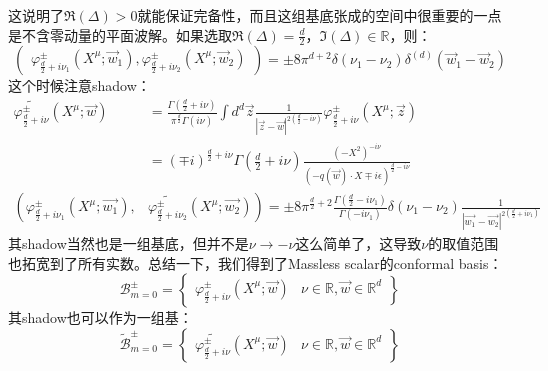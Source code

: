 这说明了$\Re(\Delta)>0$就能保证完备性，而且这组基底张成的空间中很重要的一点是不含零动量的平面波解。如果选取$\Re(\Delta)=\frac{d}{2}$，$\Im(\Delta)\in\mathbb{R}$，则：
\begin{equation}
	\begin{pmatrix}\varphi_{\frac{d}{2}+i\nu_{1}}^{\pm}(X^{\mu};\vec{w}_{1}),\varphi_{\frac{d}{2}+i\nu_{2}}^{\pm}(X^{\mu};\vec{w}_{2})\end{pmatrix}=\pm8\pi^{d+2}\delta(\nu_{1}-\nu_{2})\delta^{(d)}(\vec{w}_{1}-\vec{w}_{2})
\end{equation}
这个时候注意shadow：
\begin{equation}
	\begin{aligned}
		\widetilde{\varphi_{\frac{d}{2}+i\nu}^{\pm}}(X^{\mu};\vec{w})& =\frac{\Gamma(\frac{d}{2}+i\nu)}{\pi^{\frac{d}{2}}\Gamma(i\nu)}\int d^{d}\vec{z}\frac{1}{|\vec{z}-\vec{w}|^{2(\frac{d}{2}-i\nu)}}\varphi_{\frac{d}{2}+i\nu}^{\pm}(X^{\mu};\vec{z})  \\
		&=(\mp i)^{\frac d2+i\nu}\Gamma(\frac d2+i\nu)\frac{(-X^2)^{-i\nu}}{(-q(\vec{w})\cdot X\mp i\epsilon)^{\frac d2-i\nu}}\\
		\left(\varphi_{\frac{d}{2}+i\nu_1}^{\pm}(X^{\mu};\vec{w_1}),\right.&\left.\widetilde{\varphi_{\frac{d}{2}+i\nu_2}^{\pm}}(X^{\mu};\vec{w_2})\right)=\pm8\pi^{\frac{d}{2}+2}\frac{\Gamma(\frac{d}{2}-i\nu_1)}{\Gamma(-i\nu_1)}\delta(\nu_1-\nu_2)\frac{1}{|\vec{w_1}-\vec{w_2}|^{2(\frac{d}{2}+i\nu_1)}}
	\end{aligned}
\end{equation}
其shadow当然也是一组基底，但并不是$\nu\to-\nu$这么简单了，这导致$\nu$的取值范围也拓宽到了所有实数。总结一下，我们得到了Massless scalar的conformal basis：
\begin{equation}
	\boxed{\mathcal{B}_{m=0}^{\pm}=\left\{\begin{array}{c|c}\varphi_{\frac{d}{2}+i\nu}^{\pm}(X^{\mu};\vec{w})&\nu\in\mathbb{R},\vec{w}\in\mathbb{R}^{d}\end{array}\right\}}
\end{equation}
其shadow也可以作为一组基：
\begin{equation}
	\boxed{\widetilde{\mathcal{B}}_{m=0}^{\pm}=\left\{\begin{array}{c|c}\widetilde{\varphi_{\frac{d}{2}+i\nu}^{\pm}}(X^{\mu};\vec{w})&\nu\in\mathbb{R},\vec{w}\in\mathbb{R}^{d}\end{array}\right\}}
\end{equation}
